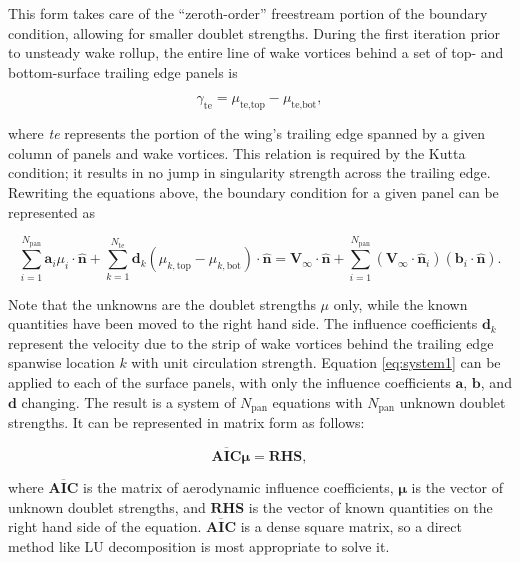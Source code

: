 \documentclass[11pt]{article}
\begin{document}
This form takes care of the ``zeroth-order'' freestream portion of the boundary
condition, allowing for smaller doublet strengths. During the first iteration
prior to unsteady wake rollup, the entire line of wake vortices behind a set of
top- and bottom-surface trailing edge panels is

\begin{equation}
\gamma_{\text{te}} = \mu_{\text{te,top}} - \mu_{\text{te,bot}},
\label{eq:wake_circ}
\end{equation}

\noindent where \emph{te} represents the portion of the wing's trailing edge
spanned by a given column of panels and wake vortices. This relation is required
by the Kutta condition; it results in no jump in singularity strength across the
trailing edge. Rewriting the equations above, the boundary condition for a given
panel can be represented as

\begin{equation}
  \sum_{i=1}^{N_{\text{pan}}}\mathbf{a}_i\mu_i\cdot\mathbf{\hat{n}}
+ \sum_{k=1}^{N_{\text{te}}}\mathbf{d}_k
    \left(\mu_{k,\text{top}} - \mu_{k,\text{bot}}\right)\cdot\mathbf{\hat{n}}
= \mathbf{V}_\infty\cdot\mathbf{\hat{n}}
+ \sum_{i=1}^{N_{\text{pan}}}\left(\mathbf{V}_\infty\cdot\mathbf{\hat{n}}_i\right)
    \left(\mathbf{b}_i\cdot\mathbf{\hat{n}}\right).
\label{eq:system1}
\end{equation}

\noindent Note that the unknowns are the doublet strengths $\mu$ only, while the
known quantities have been moved to the right hand side. The influence
coefficients $\mathbf{d}_k$ represent the velocity due to the strip of wake
vortices behind the trailing edge spanwise location $k$ with unit circulation
strength. Equation \ref{eq:system1} can be
applied to each of the surface panels, with only the influence coefficients
$\mathbf{a}$, $\mathbf{b}$, and $\mathbf{d}$ changing. The result is a system of
$N_{\text{pan}}$ equations with $N_{\text{pan}}$ unknown doublet strengths. It
can be represented in matrix form as follows:

\begin{equation}
\mathbf{\overline{AIC}}\boldsymbol{\mu} = \mathbf{RHS},
\label{eq:system2}
\end{equation}

\noindent where $\mathbf{\overline{AIC}}$ is the matrix of aerodynamic influence
coefficients,
$\boldsymbol{\mu}$ is the vector of unknown doublet strengths, and $\mathbf{RHS}$ is the
vector of known quantities on the right hand side of the equation. $\mathbf{\overline{AIC}}$
is a
dense square matrix, so a direct method like LU decomposition is most appropriate to solve
it.
\end{document}
